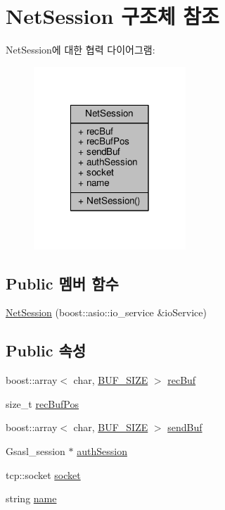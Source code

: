 \hypertarget{struct_net_session}{\section{Net\-Session 구조체 참조}
\label{struct_net_session}
}


Net\-Session에 대한 협력 다이어그램\-:\nopagebreak
\begin{figure}[H]
\begin{center}
\leavevmode
\includegraphics[width=162pt]{struct_net_session__coll__graph}
\end{center}
\end{figure}
\subsection*{Public 멤버 함수}
\begin{DoxyCompactItemize}
\item 
\hyperlink{struct_net_session_a636704de0a367698b2ec93e65b21a300}{Net\-Session} (boost\-::asio\-::io\-\_\-service \&io\-Service)
\end{DoxyCompactItemize}
\subsection*{Public 속성}
\begin{DoxyCompactItemize}
\item 
boost\-::array$<$ char, \hyperlink{load_8cpp_a6821bafc3c88dfb2e433a095df9940c6}{B\-U\-F\-\_\-\-S\-I\-Z\-E} $>$ \hyperlink{struct_net_session_ae53e0baac8f14adba2d5b7d71c715ce7}{rec\-Buf}
\item 
size\-\_\-t \hyperlink{struct_net_session_abf9c78874e44c3aa6176e288e77f5aae}{rec\-Buf\-Pos}
\item 
boost\-::array$<$ char, \hyperlink{load_8cpp_a6821bafc3c88dfb2e433a095df9940c6}{B\-U\-F\-\_\-\-S\-I\-Z\-E} $>$ \hyperlink{struct_net_session_a6e3c17623ebe78851968a210e95fcc38}{send\-Buf}
\item 
Gsasl\-\_\-session $\ast$ \hyperlink{struct_net_session_a633af90850d032509cfa243abb6898a8}{auth\-Session}
\item 
tcp\-::socket \hyperlink{struct_net_session_a93ead5e6efef575fd61ed0514100310b}{socket}
\item 
string \hyperlink{struct_net_session_aec0bfb7bd042d9f19df3fc91dd8accae}{name}
\end{DoxyCompactItemize}


